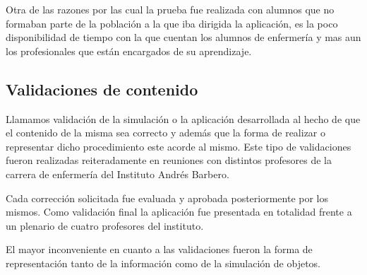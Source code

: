 Otra de las razones por las cual la prueba fue realizada con alumnos que no formaban parte de la población a la que iba dirigida la aplicación, es la poco disponibilidad de tiempo con la que cuentan los alumnos de enfermería y mas aun los profesionales que están encargados de su aprendizaje.

\subsection{Validaciones de contenido}

Llamamos validación de la simulación o la aplicación desarrollada al hecho de que el contenido de la misma sea correcto y además que la forma de realizar o representar dicho procedimiento este acorde al mismo. Este tipo de
validaciones fueron realizadas reiteradamente en reuniones con distintos profesores de la carrera de enfermería del Instituto Andrés Barbero.

Cada corrección solicitada fue evaluada y aprobada posteriormente por los mismos. Como validación final la aplicación fue presentada en totalidad frente a un plenario de cuatro profesores del instituto.

El mayor inconveniente en cuanto a las validaciones fueron la forma de representación tanto de la información como de la simulación de objetos.